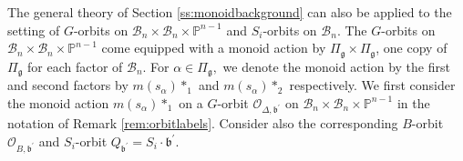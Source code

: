 \documentclass[12pt]{amsart}
\numberwithin{equation}{section}
\newtheorem{rem}[thm]{Remark}
\newcommand{\fg}{\mbox{${\mathfrak g}$}}
\newcommand{\fp}{\mbox{${\mathfrak p}$}}
\newcommand{\fb}{\mbox{${\mathfrak b}$}}
\newcommand{\B}{\mathcal{B}}
\newcommand{\ms}{m(s_{\alpha})}
\begin{document}
The general theory of Section \ref{ss:monoidbackground} can also be applied to the setting of $G$-orbits on 
$\B_{n}\times\B_{n}\times\mathbb{P}^{n-1}$ and $S_{i}$-orbits on $\B_{n}$.  The $G$-orbits on $\B_{n}\times\B_{n}\times\mathbb{P}^{n-1}$ come equipped with a monoid action by $\Pi_{\fg}\times\Pi_{\fg}$, one copy of $\Pi_{\fg}$ for each factor of $\B_{n}$.  For $\alpha \in \Pi_{\fg},$ we denote the monoid action by the first and second factors by $\ms*_{1}$ and $\ms*_{2}$ respectively. 
We first consider the monoid action  $\ms*_{1}$ on a $G$-orbit $\mathcal{O}_{\Delta,\fb^{\prime}}$ on $\B_{n}\times\B_{n}\times\mathbb{P}^{n-1}$ in the notation of Remark \ref{rem:orbitlabels}.  Consider also the corresponding $B$-orbit $\mathcal{O}_{B,\fb^{\prime}}$ and $S_i$-orbit $Q_{\fb^{\prime}}=S_{i}\cdot \fb^{\prime}.$
\end{document}
